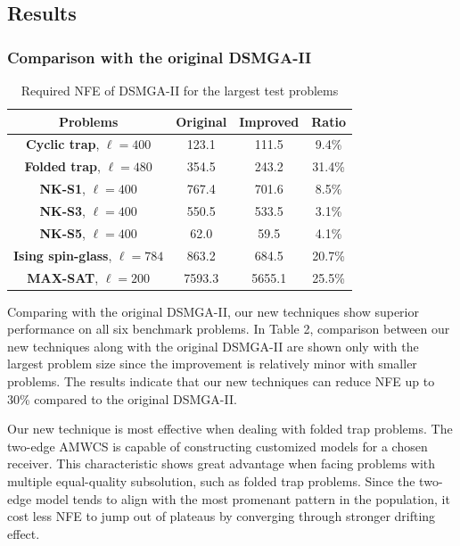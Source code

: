 \documentclass{sig-alternate-05-2015}
\begin{document}
\subsection{Results}

\subsubsection{ Comparison with the original DSMGA-II }

\begin{table}[ht]
\centering
\begin{tabular}{ |c|c|c|c| } \hline
\textbf{Problems}& \textbf{Original} & \textbf{Improved} & \textbf{Ratio}\\ \hline
\textbf{Cyclic trap}, $\ell = 400$ 		& 123.1&111.5&9.4\%\\ \hline
\textbf{Folded trap}, $\ell = 480$	 	& 354.5& 243.2&31.4\%\\ \hline
\textbf{NK-S1}, $\ell = 400$ 				& 767.4& 701.6&8.5\%\\ \hline
\textbf{NK-S3}, $\ell = 400$ 				& 550.5& 533.5&3.1\%\\ \hline
\textbf{NK-S5}, $\ell = 400$ 				& 62.0& 59.5&4.1\%\\ \hline
\textbf{Ising spin-glass}, $\ell = 784$ 	& 863.2&684.5&20.7\%\\ \hline
\textbf{MAX-SAT}, $\ell = 200$ 			& 7593.3& 5655.1&25.5\%\\ \hline
\end{tabular}
\caption{Required NFE of DSMGA-II for the largest test problems}
\end{table}

Comparing with the original DSMGA-II, our new techniques show superior performance on all six benchmark problems.
In Table 2, comparison between our new techniques along with the original DSMGA-II are shown only with the largest problem size since the improvement is relatively minor with smaller problems. 
The results indicate that our new techniques can reduce NFE up to 30\% compared to the original DSMGA-II. 


Our new technique is most effective when dealing with folded trap problems.
The two-edge AMWCS is capable of constructing customized models for a chosen receiver. 
This characteristic shows great advantage when facing problems with multiple equal-quality subsolution, such as folded trap problems.
Since the two-edge model tends to align with the most promenant pattern in the population, it cost less NFE to jump out of plateaus by converging through stronger drifting effect.
\end{document}
